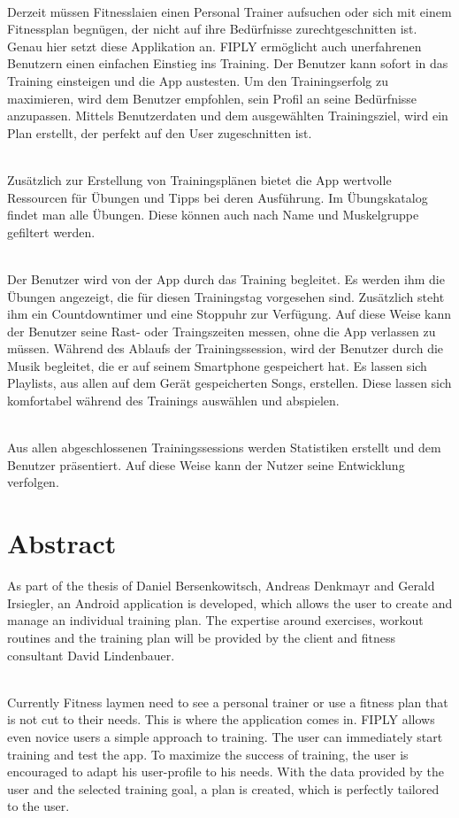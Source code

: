 \documentclass[FIPLY_base.tex]{subfiles}
\begin{document}
\ \\
Derzeit müssen Fitnesslaien einen Personal Trainer aufsuchen oder sich mit einem Fitnessplan begnügen, der nicht auf ihre Bedürfnisse zurechtgeschnitten ist. Genau hier setzt diese Applikation an. FIPLY ermöglicht auch unerfahrenen Benutzern einen einfachen Einstieg ins Training. Der Benutzer kann sofort in das Training einsteigen und die App austesten.
Um den Trainingserfolg zu maximieren, wird dem Benutzer empfohlen, sein Profil an seine Bedürfnisse anzupassen.
Mittels Benutzerdaten und dem ausgewählten Trainingsziel, wird ein Plan erstellt, der perfekt auf den User zugeschnitten ist.

\ \\
Zusätzlich zur Erstellung von Trainingsplänen bietet die App wertvolle Ressourcen für Übungen und Tipps bei deren Ausführung. Im Übungskatalog findet man alle Übungen. Diese können auch nach Name und Muskelgruppe gefiltert werden.

\ \\
Der Benutzer wird von der App durch das Training begleitet. Es werden ihm die Übungen angezeigt, die für diesen Trainingstag vorgesehen sind. Zusätzlich steht ihm ein Countdowntimer und eine Stoppuhr zur Verfügung. Auf diese Weise kann der Benutzer seine Rast- oder Traingszeiten messen, ohne die App verlassen zu müssen.  
Während des Ablaufs der Trainingssession, wird der Benutzer durch die Musik begleitet, die er auf seinem Smartphone gespeichert hat.
Es lassen sich Playlists, aus allen auf dem Gerät gespeicherten Songs, erstellen. Diese lassen sich komfortabel während des Trainings auswählen und abspielen.

\ \\
Aus allen abgeschlossenen Trainingssessions werden Statistiken erstellt und dem Benutzer präsentiert.
Auf diese Weise kann der Nutzer seine Entwicklung verfolgen. 



\newpage
\section{Abstract}
As part of the thesis of Daniel Bersenkowitsch, Andreas Denkmayr and Gerald Irsiegler, an Android application is developed, which allows the user to create and manage an individual training plan.
The expertise around exercises, workout routines and the training plan will be provided by the client and fitness consultant David Lindenbauer.

\ \\
Currently Fitness laymen need to see a personal trainer or use a fitness plan that is not cut to their needs. This is where the application comes in. FIPLY allows even novice users a simple approach to training. The user can immediately start training and test the app.
To maximize the success of training, the user is encouraged to adapt his user-profile to his needs.
With the data provided by the user and the selected training goal, a plan is created, which is perfectly tailored to the user.
\end{document}

